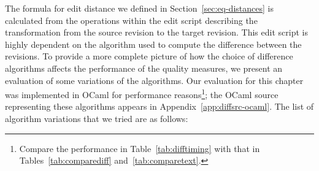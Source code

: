 The formula for edit distance we defined in
Section~\ref{sec:eq-distances} is calculated
from the operations within the edit script describing the transformation
from the source revision to the target revision.
This edit script is highly dependent on the algorithm used to
compute the difference between the revisions.
To provide a more complete picture of how the choice of difference
algorithms affects the performance of the quality measures,
we present an evaluation of some variations of the algorithms.
Our evaluation for this chapter was implemented in OCaml for performance
reasons\footnote{Compare the performance in Table~\ref{tab:difftiming}
with that in Tables~\ref{tab:comparediff} and~\ref{tab:comparetext}.};
the OCaml source representing these algorithms appears
in Appendix~\ref{app:diffsrc-ocaml}.
The list of algorithm variations that we tried are as follows:
%
